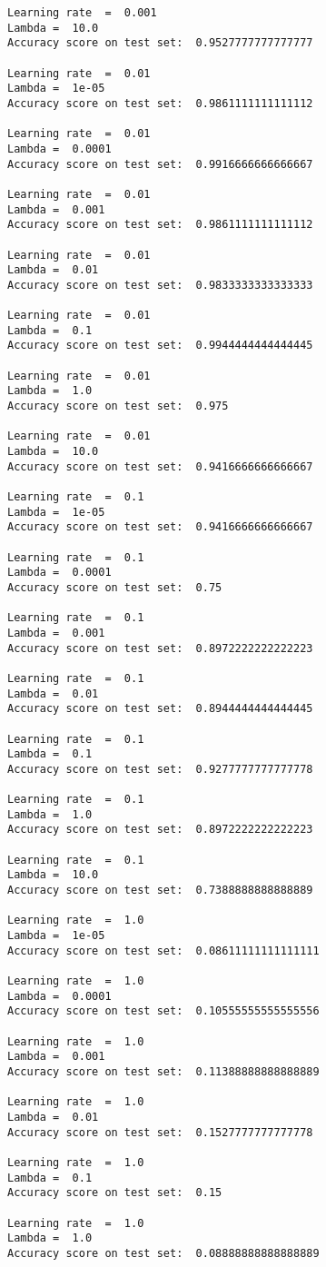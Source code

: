 \documentclass[11pt]{article}
\begin{document}
\begin{Verbatim}[commandchars=\\\{\}]
Learning rate  =  0.001
Lambda =  10.0
Accuracy score on test set:  0.9527777777777777

Learning rate  =  0.01
Lambda =  1e-05
Accuracy score on test set:  0.9861111111111112

Learning rate  =  0.01
Lambda =  0.0001
Accuracy score on test set:  0.9916666666666667

Learning rate  =  0.01
Lambda =  0.001
Accuracy score on test set:  0.9861111111111112

Learning rate  =  0.01
Lambda =  0.01
Accuracy score on test set:  0.9833333333333333

Learning rate  =  0.01
Lambda =  0.1
Accuracy score on test set:  0.9944444444444445

Learning rate  =  0.01
Lambda =  1.0
Accuracy score on test set:  0.975

Learning rate  =  0.01
Lambda =  10.0
Accuracy score on test set:  0.9416666666666667

Learning rate  =  0.1
Lambda =  1e-05
Accuracy score on test set:  0.9416666666666667

Learning rate  =  0.1
Lambda =  0.0001
Accuracy score on test set:  0.75

Learning rate  =  0.1
Lambda =  0.001
Accuracy score on test set:  0.8972222222222223

Learning rate  =  0.1
Lambda =  0.01
Accuracy score on test set:  0.8944444444444445

Learning rate  =  0.1
Lambda =  0.1
Accuracy score on test set:  0.9277777777777778

Learning rate  =  0.1
Lambda =  1.0
Accuracy score on test set:  0.8972222222222223

Learning rate  =  0.1
Lambda =  10.0
Accuracy score on test set:  0.7388888888888889

Learning rate  =  1.0
Lambda =  1e-05
Accuracy score on test set:  0.08611111111111111

Learning rate  =  1.0
Lambda =  0.0001
Accuracy score on test set:  0.10555555555555556

Learning rate  =  1.0
Lambda =  0.001
Accuracy score on test set:  0.11388888888888889

Learning rate  =  1.0
Lambda =  0.01
Accuracy score on test set:  0.1527777777777778

Learning rate  =  1.0
Lambda =  0.1
Accuracy score on test set:  0.15

Learning rate  =  1.0
Lambda =  1.0
Accuracy score on test set:  0.08888888888888889


\end{Verbatim}
\end{document}
